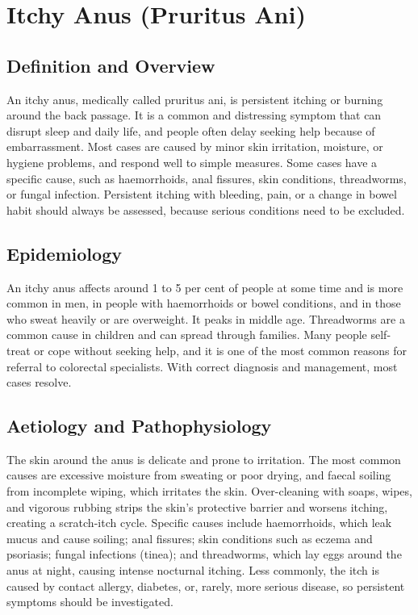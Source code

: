 \chapter{Itchy Anus (Pruritus Ani)}

\section*{Definition and Overview}
An itchy anus, medically called pruritus ani, is persistent itching or burning around the back passage. It is a common and distressing symptom that can disrupt sleep and daily life, and people often delay seeking help because of embarrassment. Most cases are caused by minor skin irritation, moisture, or hygiene problems, and respond well to simple measures. Some cases have a specific cause, such as haemorrhoids, anal fissures, skin conditions, threadworms, or fungal infection. Persistent itching with bleeding, pain, or a change in bowel habit should always be assessed, because serious conditions need to be excluded.

\section*{Epidemiology}
An itchy anus affects around 1 to 5 per cent of people at some time and is more common in men, in people with haemorrhoids or bowel conditions, and in those who sweat heavily or are overweight. It peaks in middle age. Threadworms are a common cause in children and can spread through families. Many people self-treat or cope without seeking help, and it is one of the most common reasons for referral to colorectal specialists. With correct diagnosis and management, most cases resolve.

\section*{Aetiology and Pathophysiology}
The skin around the anus is delicate and prone to irritation. The most common causes are excessive moisture from sweating or poor drying, and faecal soiling from incomplete wiping, which irritates the skin. Over-cleaning with soaps, wipes, and vigorous rubbing strips the skin's protective barrier and worsens itching, creating a scratch-itch cycle. Specific causes include haemorrhoids, which leak mucus and cause soiling; anal fissures; skin conditions such as eczema and psoriasis; fungal infections (tinea); and threadworms, which lay eggs around the anus at night, causing intense nocturnal itching. Less commonly, the itch is caused by contact allergy, diabetes, or, rarely, more serious disease, so persistent symptoms should be investigated.

